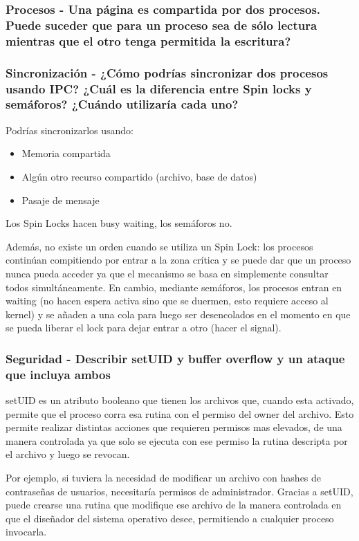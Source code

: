 \subsubsection{Procesos - Una página es compartida por dos procesos. Puede suceder que para un proceso sea de sólo lectura mientras que el otro tenga permitida la escritura?}

\subsubsection{Sincronización - ¿Cómo podrías sincronizar dos procesos usando IPC? ¿Cuál es la diferencia entre Spin locks y semáforos? ¿Cuándo utilizaría cada uno?}

Podrías sincronizarlos usando:
\begin{itemize}
\item Memoria compartida \\
\item Algún otro recurso compartido (archivo, base de datos) \\
\item Pasaje de mensaje
\end{itemize}

Los Spin Locks hacen busy waiting, los semáforos no. 

Además, no existe un orden cuando se utiliza un Spin Lock: los procesos continúan compitiendo por entrar a la zona crítica y se puede dar que un proceso nunca pueda acceder ya que el mecanismo se basa en simplemente consultar todos simultáneamente. En cambio, mediante semáforos, los procesos entran en waiting (no hacen espera activa sino que se duermen, esto requiere acceso al kernel) y se añaden a una cola para luego ser desencolados en el momento en que se pueda liberar el lock para dejar entrar a otro (hacer el signal).

\subsubsection{Seguridad - Describir setUID y buffer overflow y un ataque que incluya ambos}

setUID es un atributo booleano que tienen los archivos que, cuando esta activado, permite que el proceso corra esa rutina con el permiso del owner del archivo. Esto permite realizar distintas acciones que requieren permisos mas elevados, de una manera controlada ya que solo se ejecuta con ese permiso la rutina descripta por el archivo y luego se revocan.

Por ejemplo, si tuviera la necesidad de modificar un archivo con hashes de contraseñas de usuarios, necesitaría permisos de administrador. Gracias a setUID, puede crearse una rutina que modifique ese archivo de la manera controlada en que el diseñador del sistema operativo desee, permitiendo a cualquier proceso invocarla.

